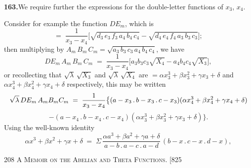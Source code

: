 \documentclass[11pt]{article}
\begin{document}
\medskip
\textbf{163.}\quad We require further the expressions for the double-letter functions of $x_{3}$, $x_{4}$.

Consider for example the function $DE_{m}$, which is
\[
=\;\frac{1}{x_{3}-x_{4}}\bigl[\sqrt{d_{3}\,e_{3}\,f_{3}\,a_{4}\,b_{4}\,c_{4}}-\sqrt{d_{4}\,e_{4}\,f_{4}\,a_{3}\,b_{3}\,c_{3}}\bigr];
\]
then multiplying by $A_{m}\,B_{m}\,C_{m}=\sqrt{a_{3}\,b_{3}\,c_{3}\,a_{4}\,b_{4}\,c_{4}}$, we have
\[
DE_{m}\,A_{m}\,B_{m}\,C_{m} \;=\; \frac{1}{x_{3}-x_{4}}\bigl[a_{3}b_{3}c_{3}\sqrt{X_{4}}-a_{4}b_{4}c_{4}\sqrt{X_{3}}\bigr],
\]
or recollecting that $\sqrt{\lambda}\,\sqrt{X_{3}}$ and $\sqrt{\lambda}\,\sqrt{X_{4}}$ are $=\alpha x_{3}^{3}+\beta x_{3}^{2}+\gamma x_{3}+\delta$ and $\alpha x_{4}^{3}+\beta x_{4}^{2}+\gamma x_{4}+\delta$
respectively, this may be written
\[
\resizebox{\textwidth}{!}{$\displaystyle
\sqrt{\lambda}\,DE_{m}\,A_{m}B_{m}C_{m} \;=\; \frac{1}{x_{3}-x_{4}}\bigl\{(a-x_{3}\,.\,b-x_{3}\,.\,c-x_{3})(\alpha x_{4}^{3}+\beta x_{4}^{2}+\gamma x_{4}+\delta)
$}
\]
\[
-(a-x_{4}\,.\,b-x_{4}\,.\,c-x_{4})(\alpha x_{3}^{3}+\beta x_{3}^{2}+\gamma x_{3}+\delta)\bigr\}.
\]
Using the well-known identity
\[
\alpha x^{3}+\beta x^{2}+\gamma x+\delta \;=\; \Sigma\,\frac{\alpha a^{3}+\beta a^{2}+\gamma a+\delta}{a-b\,.\,a-c\,.\,a-d}\,(b-x\,.\,c-x\,.\,d-x),
\]

\newpage
\noindent\textsc{208 \hfill A Memoir on the Abelian and Theta Functions. \hfill [825}
\vspace{0.6em}
\end{document}
